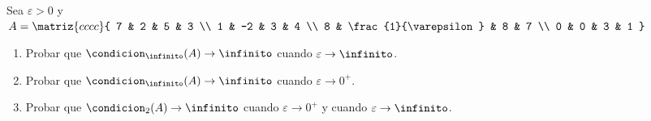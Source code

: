 \begin{enunciado}{\ejExtra}
  Sea $\varepsilon > 0$ y
  $A =
    \matriz{cccc}{
      7 & 2 & 5 & 3 \\
      1 & -2 & 3 & 4 \\
      8 & \frac{1}{\varepsilon} & 8 & 7 \\
      0 & 0 & 3 & 1
    }$
  \begin{enumerate}[label=\alph*)]
    \item Probar que $\condicion_\infinito(A)\to \infinito$ cuando $\varepsilon \to \infinito$.
    \item Probar que $\condicion_\infinito(A)\to \infinito$ cuando $\varepsilon \to 0^+$.
    \item Probar que $\condicion_2(A)\to \infinito$ cuando $\varepsilon \to 0^+$ y cuando $\varepsilon \to \infinito$.
  \end{enumerate}
\end{enunciado}


